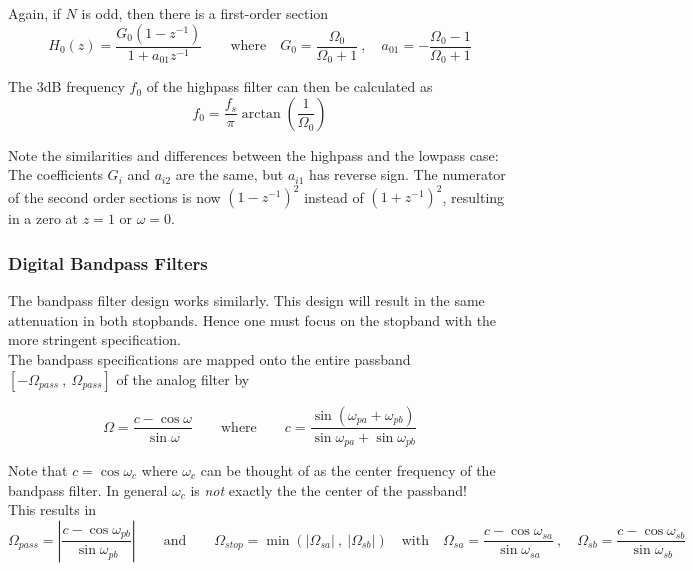 Again, if $N$ is odd, then there is a first-order section
\begin{equation*}
	H_0(z) = \frac{G_0(1-z^{-1})}{1 + a_{01} z^{-1}} \qquad \text{where} \quad
	G_0 = \frac{\Omega_0}{\Omega_0 + 1} \:,\quad 
	a_{01} = -\frac{\Omega_0 - 1}{\Omega_0 + 1}
\end{equation*}

The 3dB frequency $f_0$ of the highpass filter can then be calculated as
\begin{equation*}
	f_0 = \frac{f_s}{\pi} \arctan\left(\frac{1}{\Omega_0}\right)
\end{equation*}

Note the similarities and differences between the highpass and the lowpass
case: The coefficients $G_i$ and $a_{i2}$ are the same, but $a_{i1}$ has
reverse sign. The numerator of the second order sections is now $(1-z^{-1})^2$
instead of $(1+z^{-1})^2$, resulting in a zero at $z=1$ or $\omega=0$.

\subsubsection{Digital Bandpass Filters}
The bandpass filter design works similarly. This design will result in the
same attenuation in both stopbands. Hence one must focus on the stopband
with the more stringent specification. \\

The bandpass specifications are mapped onto the entire passband 
$[-\Omega_{pass}\:,\:\Omega_{pass}]$ of the analog filter by

\begin{equation*}
		\Omega = \frac{c - \cos\omega}{\sin\omega} \qquad \text{where} \qquad
		c = \frac{\sin\left(\omega_{pa}+\omega_{pb}\right)}
		{\sin\omega_{pa}+\sin\omega_{pb}}
\end{equation*}

Note that $c=\cos\omega_c$ where $\omega_c$ can be thought of as the center
frequency of the bandpass filter. In general $\omega_c$ is \emph{not} exactly
the the center of the passband! \\

This results in
\begin{equation*}
	\Omega_{pass} = \left| \frac{c - \cos\omega_{pb}}{\sin\omega_{pb}} \right|
	\qquad \text{and} \qquad
	\Omega_{stop} = \min\left( |\Omega_{sa}|\:,\:|\Omega_{sb}| \right)
	\quad \text{with} \quad
	\Omega_{sa} = \frac{c-\cos\omega_{sa}}{\sin\omega_{sa}}\:, \quad
	\Omega_{sb} = \frac{c-\cos\omega_{sb}}{\sin\omega_{sb}}
\end{equation*}

